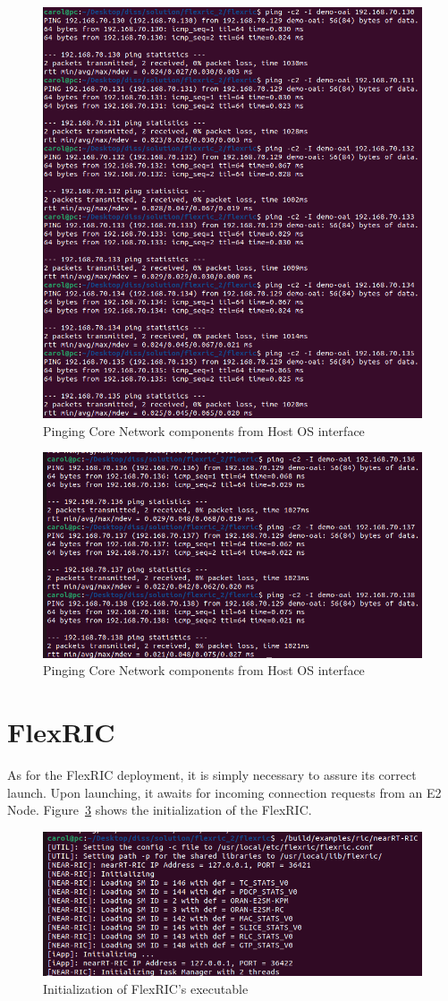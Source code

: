 \begin{figure}[H]
\centering
\includegraphics[width=0.5\linewidth]{figures/ping_core_1}
\caption[Pinging Core Network components from Host OS
interface]{Pinging Core Network components from Host OS
interface}
\label{fig:ping_core1}
\end{figure}

\begin{figure}[H]
    \centering
    \includegraphics[width=0.5\linewidth]{figures/ping_core_2}
    \caption[Pinging Core Network components from Host OS
    interface]{Pinging Core Network components from Host OS
    interface}
    \label{fig:ping_core2}
\end{figure}




\section{FlexRIC}\label{sec:flexric}
As for the FlexRIC deployment, it is simply necessary to assure its correct launch.
Upon launching, it awaits for incoming connection requests from an E2 Node.
Figure~\ref{fig:near-rt-ric} shows the initialization of the FlexRIC\@.

\begin{figure}[H]
    \centering
    \includegraphics[width=0.5\linewidth]{figures/flexric_init}
    \caption{Initialization of FlexRIC's executable}
    \label{fig:near-rt-ric}
\end{figure}

